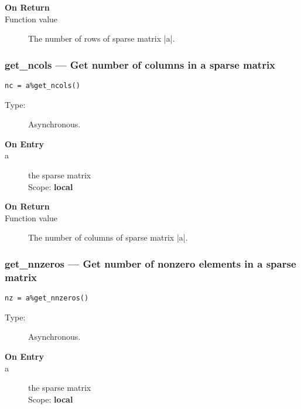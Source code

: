 \begin{description}
\item[\bf On Return]
\item[Function value] The number of  rows  of sparse matrix \fortinline|a|.
\end{description}


\subsubsection{get\_ncols --- Get number of  columns in a  sparse
  matrix}

\begin{verbatim}
nc = a%get_ncols()
\end{verbatim}

\begin{description}
\item[Type:] Asynchronous.
\item[\bf On Entry]
\item[a] the sparse matrix\\
Scope: {\bf local}\\
\end{description}

\begin{description}
\item[\bf On Return]
\item[Function value] The number of  columns  of sparse matrix \fortinline|a|.
\end{description}


\subsubsection{get\_nnzeros --- Get number of nonzero elements
  in a sparse matrix}

\begin{verbatim}
nz = a%get_nnzeros()
\end{verbatim}

\begin{description}
\item[Type:] Asynchronous.
\item[\bf On Entry]
\item[a] the sparse matrix\\
Scope: {\bf local}\\
\end{description}

